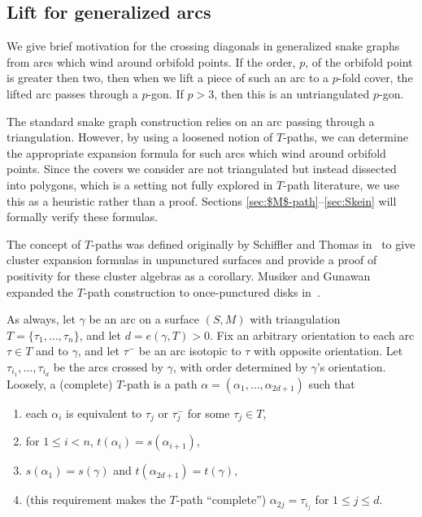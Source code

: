 \documentclass[11pt]{article}
\numberwithin{equation}{section}
\begin{document}
\subsection{Lift for generalized arcs}\label{subsec:LiftGenArc}

We give brief motivation for the crossing diagonals in generalized snake graphs from arcs which wind around orbifold points. If the order, $p$, of the orbifold point is greater then two, then when we lift a piece of such an arc to a $p$-fold cover, the lifted arc passes through a $p$-gon. If $p > 3$, then this is an untriangulated $p$-gon.

The standard snake graph construction relies on an arc passing through a triangulation. However, by using a loosened notion of $T$-paths, we can determine the appropriate expansion formula for such arcs which wind around orbifold points. Since the covers we consider are not triangulated but instead dissected into polygons, which is a setting not fully explored in $T$-path literature, we use this as a heuristic rather than a proof. Sections \ref{sec:$M$-path}--\ref{sec:Skein} will formally verify these formulas.

The concept of $T$-paths was defined originally by Schiffler and Thomas in~\cite{Schiffler-Thomas} to give cluster expansion formulas in unpunctured surfaces and provide a proof of positivity for these cluster algebras as a corollary. Musiker and Gunawan expanded the $T$-path construction to once-punctured disks in~\cite{Musiker-Gunawan}.

As always, let $\gamma$ be an arc on a surface $(S,M)$ with triangulation $T = \{\tau_1, \ldots, \tau_n\}$, and let $d = e(\gamma,T) > 0$. Fix an arbitrary orientation to each arc $\tau \in T$ and to $\gamma$, and let $\tau^-$ be an arc isotopic to $\tau$ with opposite orientation. Let $\tau_{i_1},\ldots, \tau_{i_d}$ be the arcs crossed by $\gamma$, with order determined by $\gamma$'s orientation. Loosely, a (complete) $T$-path is a path $\alpha = (\alpha_1,\ldots, \alpha_{2d+1})$ such that
\begin{enumerate}\itemsep=0pt
 \item[1)] each $\alpha_i$ is equivalent to $\tau_j$ or $\tau_j^-$ for some $\tau_j \in T$,
 \item[2)] for $1 \leq i < n$, $t(\alpha_i) = s(\alpha_{i+1})$,
 \item[3)] $s(\alpha_1) = s(\gamma)$ and $t(\alpha_{2d+1}) = t(\gamma)$,
 \item[4)] (this requirement makes the $T$-path ``complete'') $\alpha_{2j} = \tau_{i_j}$ for $1 \leq j \leq d$.
\end{enumerate}
\end{document}
